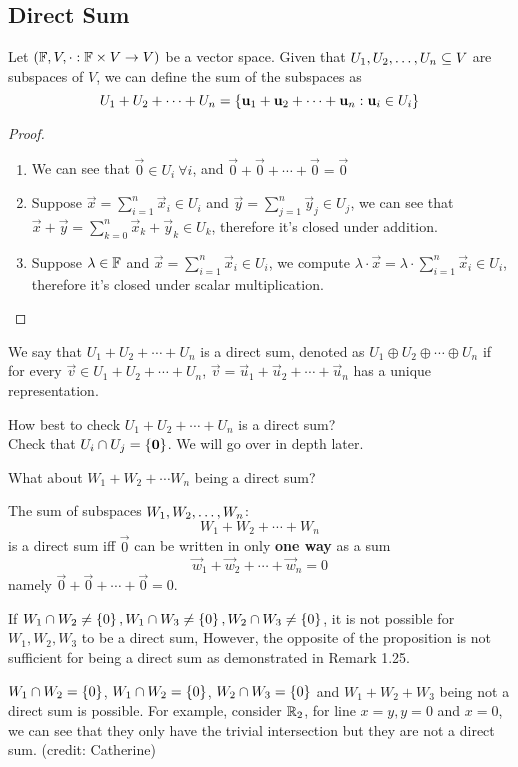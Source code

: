\subsection{Direct Sum}
\begin{definition}
    Let $(\mathbb F, V, \cdot : \mathbb F \times V \to V)$ be a vector space. Given that ${U}_1,{U}_2, \ldots, {U}_{n} \subseteq V$ are subspaces of $V$, we can define the sum of the subspaces as 
    \[ U_1 + U_2 + \cdots + U_n = \left\{ \mathbf u_1 + \mathbf u_2 + \cdots + \mathbf u_n : \mathbf u_i \in U_i \right\} \]
\end{definition}
\begin{proof}
    \begin{enumerate} [label  = \arabic*)]
        \item We can see that $\vec 0 \in U_i \ \forall i$, and $\vec 0 + \vec 0 + \cdots + \vec 0 = \vec 0$
        \item Suppose $\vec x = \sum_{i = 1}^n \vec x_i \in U_i$ and $\vec  y = \sum_{j = 1}^n \vec y_j \in U_j$, we can see that $\vec x + \vec y = \sum_{k = 0}^n \vec x_k + \vec y_k \in U_k$, therefore it's closed under addition.
        \item Suppose $\lambda \in \mathbb F$ and $\vec x = \sum_{i = 1}^n \vec x_i \in U_i$, we compute $\lambda \cdot \vec x = \lambda \cdot \sum_{i = 1}^n \vec x_i \in U_i$, therefore it's closed under scalar multiplication.
    \end{enumerate}
\end{proof}
\begin{definition}
    We say that $U_1 + U_2 + \cdots + U_n$ is a direct sum, denoted as $U_1 \oplus U_2 \oplus \cdots \oplus U_n$ if for every $\vec v \in U_1 + U_2 + \cdots + U_n$, $\vec v = \vec u_1 + \vec u_2 + \cdots + \vec u_n$ has a unique representation. 
\end{definition} 
\begin{remark}
    How best to check $U_1 + U_2 + \cdots + U_n$ is a direct sum? \\
    Check that $U_i \cap U_j = \left\{ \mathbf 0 \right\}$. We will go over in depth later.
\end{remark}
What about $W_1 + W_2 + \cdots W_n$ being a direct sum?
\begin{theorem}
    The sum of subspaces ${W}_1,{W}_2, \ldots, {W}_{n}$: 
    \[W_1 + W_2 + \cdots + W_n\]
    is a direct sum iff $\vec 0$ can be written in only \textbf{one way} as a sum 
    \[ \vec w_1 + \vec w_2 + \cdots + \vec w_n = 0\]
    namely $\vec 0 + \vec 0 + \cdots + \vec 0 = 0$.
\end{theorem}
\begin{remark}
    If $W_1 \cap W_2 \neq \left\{ 0 \right\}, W_1 \cap W_3 \neq \left\{ 0 \right\}, W_2 \cap W_3 \neq \left\{ 0 \right\}$, it is not possible for $W_1,W_2,W_3$ to be a direct sum, However, the opposite of the proposition is not sufficient for being a direct sum as demonstrated in Remark 1.25.
\end{remark}
\begin{remark}
    $W_1 \cap W_2 = \left\{ 0 \right\}$, $W_1 \cap W_2 = \left\{ 0 \right\}$, $W_2 \cap W_3 = \left\{ 0 \right\}$ and $W_1 + W_2 + W_3$ being not a direct sum is possible. For example, consider $\mathbb R_2$, for line $x = y, y = 0$ and $x = 0$, we can see that they only have the trivial intersection but they are not a direct sum. (credit: Catherine)
\end{remark}
\newpage 